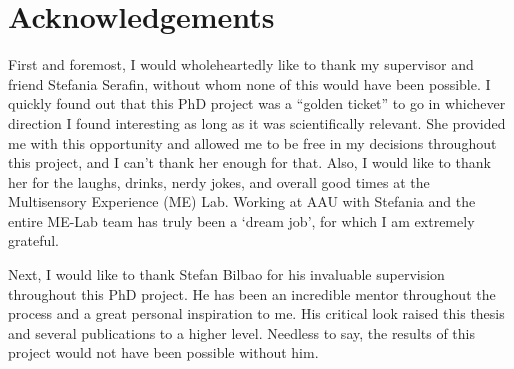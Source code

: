 

\pagebreak
\section*{Acknowledgements}
First and foremost, I would wholeheartedly like to thank my supervisor and friend Stefania Serafin, without whom none of this would have been possible. I quickly found out that this PhD project was a ``golden ticket'' to go in whichever direction I found interesting as long as it was scientifically relevant. She provided me with this opportunity and allowed me to be free in my decisions throughout this project, and I can't thank her enough for that. Also, I would like to thank her for the laughs, drinks, nerdy jokes, and overall good times at the Multisensory Experience (ME) Lab. Working at AAU with Stefania and the entire ME-Lab team has truly been a `dream job', for which I am extremely grateful. 



Next, I would like to thank Stefan Bilbao for his invaluable supervision throughout this PhD project. He has been an incredible mentor throughout the process and a great personal inspiration to me. His critical look raised this thesis and several publications to a higher level. Needless to say, the results of this project would not have been possible without him. 


